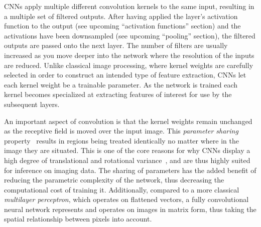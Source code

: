 CNNs apply multiple different convolution kernels to the same input, resulting in a multiple set of filtered outputs.
After having applied the layer's activation function to the output (see upcoming \enquote{activation functions} section) and the activations have been downsampled (see upcoming \enquote{pooling} section), the filtered outputs are passed onto the next layer.
The number of filters are usually increased as you move deeper into the network where the resolution of the inputs are reduced.
Unlike classical image processing, where kernel weights are carefully selected in order to construct an intended type of feature extraction, CNNs let each kernel weight be a trainable parameter.
As the network is trained each kernel becomes specialized at extracting features of interest for use by the subsequent layers.

An important aspect of convolution is that the kernel weights remain unchanged as the receptive field is moved over the input image.
This \textit{parameter sharing} property~\cite{visint-cnn} results in regions being treated identically no matter where in the image they are situated.
This is one of the core reasons for why CNNs display a high degree of translational and rotational variance~\cite{cnn-translational-invariance}, and are thus highly suited for inference on imaging data.
The sharing of parameters has the added benefit of reducing the parametric complexity of the network, thus decreasing the computational cost of training it.
Additionally, compared to a more classical \textit{multilayer perceptron}, which operates on flattened vectors, a fully convolutional neural network represents and operates on images in matrix form, thus taking the spatial relationship between pixels into account.
